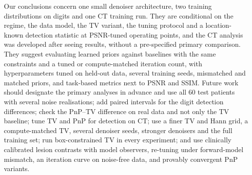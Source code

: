 Our conclusions concern one small denoiser architecture, two training distributions on digits and one CT training run. They are conditional on the regime, the data model, the TV variant, the tuning protocol and a location-known detection statistic at PSNR-tuned operating points, and the CT analysis was developed after seeing results, without a pre-specified primary comparison.
They suggest evaluating learned priors against baselines with the same constraints and a tuned or compute-matched iteration count, with hyperparameters tuned on held-out data, several training seeds, mismatched and matched priors, and task-based metrics next to PSNR and SSIM.
Future work should designate the primary analyses in advance and use all 60 test patients with several noise realisations; add paired intervals for the digit detection differences; check the PnP--TV difference on real data and not only the TV baseline; tune TV and PnP for detection on CT; use a finer TV and Hann grid, a compute-matched TV, several denoiser seeds, stronger denoisers and the full training set; run box-constrained TV in every experiment; and use clinically calibrated lesion contrasts with model observers, re-tuning under forward-model mismatch, an iteration curve on noise-free data, and provably convergent PnP variants.